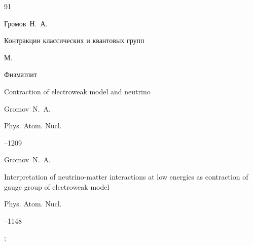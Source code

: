 \begin{thebibliography}{91}


\by  Громов~Н.~А.

\book Контракции классических и квантовых групп

\publaddr М.

\publ Физматлит








\paper Contraction of electroweak model and neutrino

\by Gromov~N.~A.

\jour Phys. Atom. Nucl.




--1209












\by Gromov~N.~A.

\paper  Interpretation of neutrino-matter interactions at low energies as contraction of gauge group of electroweak model

\jour Phys. Atom. Nucl.




--1148


;









\end{thebibliography}
